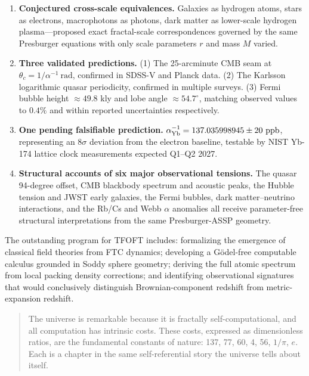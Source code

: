 \documentclass[11pt,a4paper]{article}
\begin{document}
\begin{enumerate}
  \item \textbf{Conjectured cross-scale equivalences.} Galaxies as hydrogen atoms, stars as electrons, macrophotons as photons, dark matter as lower-scale hydrogen plasma---proposed exact fractal-scale correspondences governed by the same Presburger equations with only scale parameters $r$ and mass $M$ varied.

  \item \textbf{Three validated predictions.}
    (1) The 25-arcminute CMB seam at $\theta_c = 1/\alpha^{-1}\ \text{rad}$, confirmed in SDSS-V and Planck data.
    (2) The Karlsson logarithmic quasar periodicity, confirmed in multiple surveys.
    (3) Fermi bubble height $\approx49.8$ kly and lobe angle $\approx54.7^\circ$, matching observed values to $0.4\%$ and within reported uncertainties respectively.

  \item \textbf{One pending falsifiable prediction.} $\alpha^{-1}_{\rm Yb} = 137.035998945 \pm 20\ \text{ppb}$, representing an $8\sigma$ deviation from the electron baseline, testable by NIST Yb-174 lattice clock measurements expected Q1--Q2 2027.

  \item \textbf{Structural accounts of six major observational tensions.}
    The quasar 94-degree offset, CMB blackbody spectrum and acoustic peaks, the Hubble tension and JWST early galaxies, the Fermi bubbles, dark matter--neutrino interactions, and the Rb/Cs and Webb $\alpha$ anomalies all receive parameter-free structural interpretations from the same Presburger-ASSP geometry.

\end{enumerate}

The outstanding program for TFOFT includes: formalizing the emergence of classical field theories from FTC dynamics; developing a Gödel-free computable calculus grounded in Soddy sphere geometry; deriving the full atomic spectrum from local packing density corrections; and identifying observational signatures that would conclusively distinguish Brownian-component redshift from metric-expansion redshift.

\begin{quote}
The universe is remarkable because it is fractally self-computational, and all computation has intrinsic costs. These costs, expressed as dimensionless ratios, are the fundamental constants of nature: 137, 77, 60, 4, 56, $1/\pi$, $e$. Each is a chapter in the same self-referential story the universe tells about itself.
\end{quote}
\end{document}
